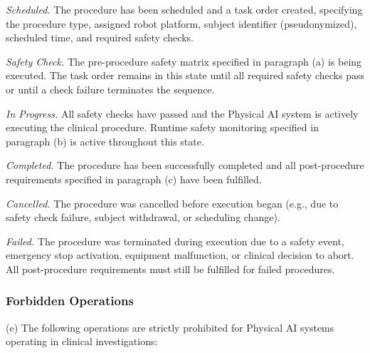 \documentclass[11pt]{article}
\begin{document}
\begin{description}[leftmargin=1.0cm,style=sameline]
\item[(1)] \textit{Scheduled.} The procedure has been scheduled and a task order created, specifying the procedure type, assigned robot platform, subject identifier (pseudonymized), scheduled time, and required safety checks.
\item[(2)] \textit{Safety Check.} The pre-procedure safety matrix specified in paragraph (a) is being executed. The task order remains in this state until all required safety checks pass or until a check failure terminates the sequence.
\item[(3)] \textit{In Progress.} All safety checks have passed and the Physical AI system is actively executing the clinical procedure. Runtime safety monitoring specified in paragraph (b) is active throughout this state.
\item[(4)] \textit{Completed.} The procedure has been successfully completed and all post-procedure requirements specified in paragraph (c) have been fulfilled.
\item[(5)] \textit{Cancelled.} The procedure was cancelled before execution began (e.g., due to safety check failure, subject withdrawal, or scheduling change).
\item[(6)] \textit{Failed.} The procedure was terminated during execution due to a safety event, emergency stop activation, equipment malfunction, or clinical decision to abort. All post-procedure requirements must still be fulfilled for failed procedures.
\end{description}

\subsubsection{Forbidden Operations}

(e) The following operations are strictly prohibited for Physical AI systems operating in clinical investigations:
\end{document}
